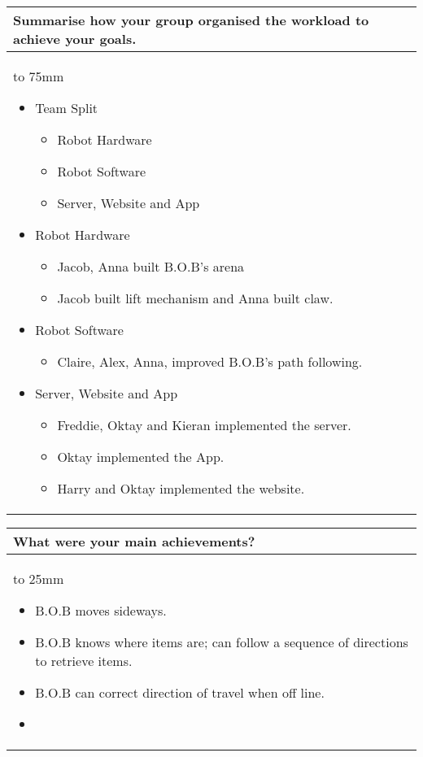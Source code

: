\documentclass[a4paper]{article}
\newcommand{\colWidth}{141mm}
\begin{document}
\begin{center}

\begin{tabular}{|p{\colWidth}|}
	\hline
	\cellcolor{blue!25}\large
	\textbf{Summarise how your group organised the workload to achieve your goals.}
	\\ \hline
	\vtop to 75mm{
	\begin{itemize}
	    \item Team Split
	    \begin{itemize}
	        \item Robot Hardware
	        \item Robot Software
	        \item Server, Website and App 
	    \end{itemize}
	    \item Robot Hardware
	    \begin{itemize}
	        \item Jacob, Anna built B.O.B's arena
	        \item Jacob built lift mechanism and Anna built claw.
	    \end{itemize}
	    \item Robot Software
	    \begin{itemize}
	        \item Claire, Alex, Anna, improved B.O.B's path following.
	    \end{itemize}
	    \item Server, Website and App 
	    \begin{itemize}
	        \item Freddie, Oktay and Kieran implemented the server.
	        \item Oktay implemented the App.
	        \item Harry and Oktay implemented the website.
	    \end{itemize}
	\end{itemize}
  }
  \\
  \hline
\end{tabular}
\vskip 5mm


\begin{tabular}{|p{\colWidth}|}
	\hline
	\cellcolor{blue!25}\large
	\textbf{What were your main achievements?}
	\\ \hline
	\vtop to 25mm{
	\begin{itemize}
	    \item B.O.B moves sideways.
	    \item B.O.B knows where items are; can follow a sequence of directions to retrieve items.
	    \item B.O.B can correct direction of travel when off line.
	    \item 
	\end{itemize}
  }
  \\
  \hline
\end{tabular}
\vskip 5mm


\end{center}
\end{document}
